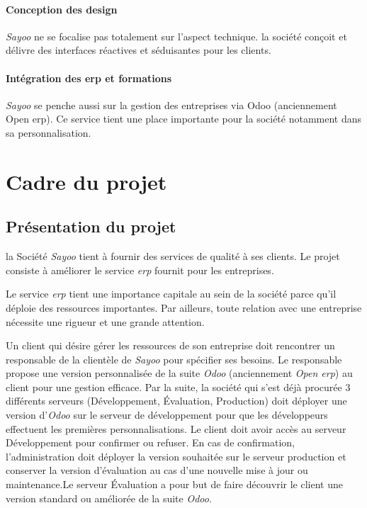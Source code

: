 \begin{onehalfspace}
\paragraph*{Conception des design}
\emph{Sayoo} ne se focalise pas totalement sur l'aspect technique. la société conçoit et délivre des interfaces réactives et séduisantes pour les clients.


\paragraph*{Intégration des \acrshort{erp} et formations}
\emph{Sayoo} se penche aussi sur la gestion des entreprises via Odoo (anciennement Open \acrshort{erp}). Ce service tient une place importante pour la société notamment dans sa personnalisation.

\section{Cadre du projet}


\subsection{Présentation du projet}
 
la Société \emph{Sayoo} tient à fournir des services de qualité à ses clients. Le projet consiste à améliorer le service \emph{\acrshort{erp}} fournit pour les entreprises.

Le service \emph{\acrshort{erp}} tient une importance capitale au sein de la société parce qu'il déploie des ressources importantes. Par ailleurs, toute relation avec une entreprise nécessite une rigueur et une grande attention.

Un client qui désire gérer les ressources de son entreprise doit rencontrer un responsable de la clientèle de \emph{Sayoo} pour spécifier ses besoins. Le responsable propose une version personnalisée de la suite \emph{Odoo} (anciennement \emph{Open \acrshort{erp}}) au client pour une gestion efficace. Par la suite, la société qui s'est déjà procurée  3 différents serveurs (Développement, Évaluation, Production) doit déployer une version d'\emph{Odoo} sur le serveur de développement pour que les développeurs effectuent les premières personnalisations. Le client doit avoir accès au serveur Développement pour confirmer ou refuser. En cas de confirmation, l'administration doit déployer la version souhaitée sur le serveur production et conserver la version d'évaluation au cas d'une nouvelle mise à jour ou maintenance.Le serveur Évaluation a pour but de faire découvrir le client une version standard ou améliorée de la suite \emph{Odoo}.  


\end{onehalfspace}
